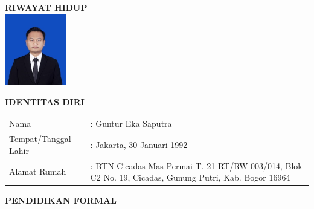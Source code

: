 \newpage %


\pagestyle{empty}


%			

\centering \large \textbf{RIWAYAT HIDUP}\\
\hspace{1,2cm}
\includegraphics[width=0.2\textwidth, left]{foto_cv_guntur.jpg}

\vspace{1cm}
\noindent \textbf{IDENTITAS DIRI}
\vspace{0.2cm}


\begin{table}[H]
	\label{tab:my-table}
	\begin{tabular}{p{5cm}p{7cm}}
		Nama                 & : Guntur Eka Saputra                                                                                  \\
		Tempat/Tanggal Lahir & : Jakarta, 30 Januari 1992                                                                            \\
		Alamat Rumah         & : BTN Cicadas Mas Permai T. 21 RT/RW 003/014, Blok C2 No. 19, Cicadas, Gunung Putri, Kab. Bogor 16964
	\end{tabular}
\end{table}


\vspace{8cm}
\noindent \textbf{PENDIDIKAN FORMAL}
\vspace{0.2cm}

